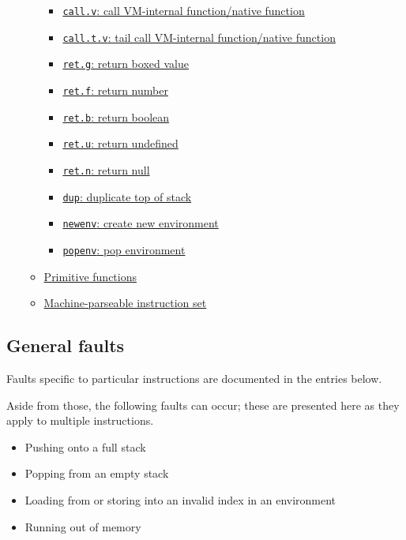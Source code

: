 \begin{itemize}
\begin{itemize}
\begin{itemize}
\item \hyperref[sec:org008ae6e]{\texttt{call.v}:
call VM-internal function/native function}
\item \hyperref[sec:org22cfce9]{\texttt{call.t.v}:
tail call VM-internal function/native function}
\item \hyperref[sec:org5c86ae1]{\texttt{ret.g}: return boxed value}
\item \hyperref[sec:org24d7891]{\texttt{ret.f}: return number}
\item \hyperref[sec:org489d37c]{\texttt{ret.b}: return boolean}
\item \hyperref[sec:org4462eb4]{\texttt{ret.u}: return undefined}
\item \hyperref[sec:org02d0940]{\texttt{ret.n}: return null}
\item \hyperref[sec:orgde7ff7a]{\texttt{dup}: duplicate top of stack}
\item \hyperref[sec:orgb7d0128]{\texttt{newenv}: create new
environment}
\item \hyperref[sec:org4cc850b]{\texttt{popenv}: pop environment}
\end{itemize}

\item \hyperref[sec:org22a9c67]{Primitive functions}
\item \hyperref[sec:org5fffbe9]{Machine-parseable instruction
set}
\end{itemize}
\end{itemize}

\subsection{General faults}
\label{sec:orgd013882}
Faults specific to particular instructions are documented in the entries
below.

Aside from those, the following faults can occur; these are presented
here as they apply to multiple instructions.

\begin{itemize}
\item Pushing onto a full stack

\item Popping from an empty stack

\item Loading from or storing into an invalid index in an environment

\item Running out of memory
\end{itemize}

